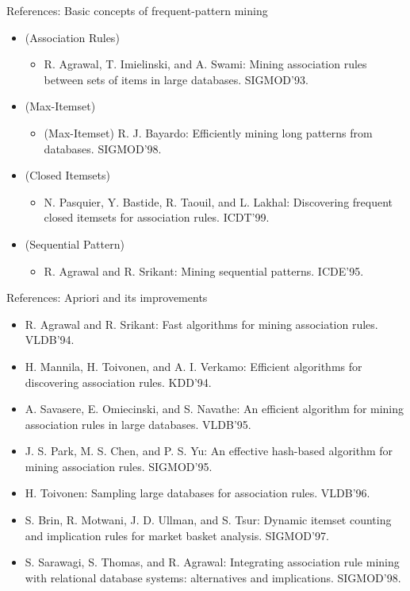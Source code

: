 \documentclass[aspectratio=169,t]{beamer}
\begin{document}
  {
    \begin{frame}{References: Basic concepts of frequent-pattern mining}
    \begin{itemize}
      \item (Association Rules)
      \begin{itemize}
        \item R. Agrawal, T. Imielinski, and A. Swami: Mining association rules between sets of items in large databases. SIGMOD'93.
      \end{itemize}
      \item (Max-Itemset)
      \begin{itemize}
        \item (Max-Itemset) R. J. Bayardo: Efficiently mining long patterns from databases. SIGMOD'98.
      \end{itemize}
      \item (Closed Itemsets)
      \begin{itemize}
        \item N. Pasquier, Y. Bastide, R. Taouil, and L. Lakhal: Discovering frequent closed itemsets for association rules. ICDT'99.
      \end{itemize}
      \item (Sequential Pattern)
      \begin{itemize}
        \item R. Agrawal and R. Srikant: Mining sequential patterns. ICDE'95.
      \end{itemize}
    \end{itemize}
    \end{frame}
  }

  {
    \begin{frame}{References: Apriori and its improvements}
    \begin{itemize}
      \item R. Agrawal and R. Srikant: Fast algorithms for mining association rules. VLDB'94.
      \item H. Mannila, H. Toivonen, and A. I. Verkamo: Efficient algorithms for discovering association rules. KDD'94.
      \item A. Savasere, E. Omiecinski, and S. Navathe: An efficient algorithm for mining association rules in large databases. VLDB'95.
      \item J. S. Park, M. S. Chen, and P. S. Yu: An effective hash-based algorithm for mining association rules. SIGMOD'95.
      \item H. Toivonen: Sampling large databases for association rules. VLDB'96.
      \item S. Brin, R. Motwani, J. D. Ullman, and S. Tsur: Dynamic itemset counting and implication rules for market basket analysis. SIGMOD'97.
      \item S. Sarawagi, S. Thomas, and R. Agrawal: Integrating association rule mining with relational database systems: alternatives and implications. SIGMOD'98.
    \end{itemize}
    \end{frame}
  }
\end{document}
